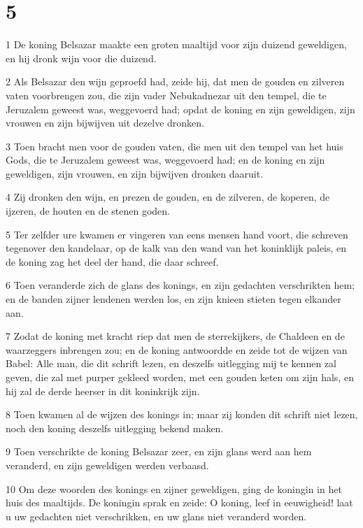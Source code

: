 \chapter{5}

\par 1 De koning Belsazar maakte een groten maaltijd voor zijn duizend geweldigen, en hij dronk wijn voor die duizend.
\par 2 Als Belsazar den wijn geproefd had, zeide hij, dat men de gouden en zilveren vaten voorbrengen zou, die zijn vader Nebukadnezar uit den tempel, die te Jeruzalem geweest was, weggevoerd had; opdat de koning en zijn geweldigen, zijn vrouwen en zijn bijwijven uit dezelve dronken.
\par 3 Toen bracht men voor de gouden vaten, die men uit den tempel van het huis Gods, die te Jeruzalem geweest was, weggevoerd had; en de koning en zijn geweldigen, zijn vrouwen, en zijn bijwijven dronken daaruit.
\par 4 Zij dronken den wijn, en prezen de gouden, en de zilveren, de koperen, de ijzeren, de houten en de stenen goden.
\par 5 Ter zelfder ure kwamen er vingeren van eens mensen hand voort, die schreven tegenover den kandelaar, op de kalk van den wand van het koninklijk paleis, en de koning zag het deel der hand, die daar schreef.
\par 6 Toen veranderde zich de glans des konings, en zijn gedachten verschrikten hem; en de banden zijner lendenen werden los, en zijn knieen stieten tegen elkander aan.
\par 7 Zodat de koning met kracht riep dat men de sterrekijkers, de Chaldeen en de waarzeggers inbrengen zou; en de koning antwoordde en zeide tot de wijzen van Babel: Alle man, die dit schrift lezen, en deszelfs uitlegging mij te kennen zal geven, die zal met purper gekleed worden, met een gouden keten om zijn hals, en hij zal de derde heerser in dit koninkrijk zijn.
\par 8 Toen kwamen al de wijzen des konings in; maar zij konden dit schrift niet lezen, noch den koning deszelfs uitlegging bekend maken.
\par 9 Toen verschrikte de koning Belsazar zeer, en zijn glans werd aan hem veranderd, en zijn geweldigen werden verbaasd.
\par 10 Om deze woorden des konings en zijner geweldigen, ging de koningin in het huis des maaltijds. De koningin sprak en zeide: O koning, leef in eeuwigheid! laat u uw gedachten niet verschrikken, en uw glans niet veranderd worden.
